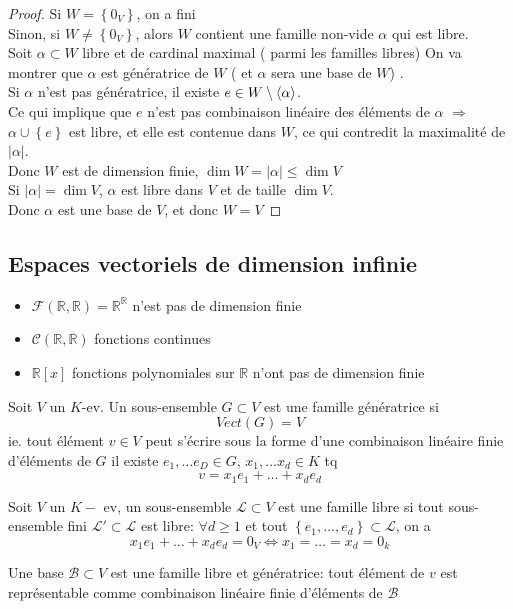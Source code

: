 \documentclass[../main.tex]{subfiles}
\begin{document}
\begin{proof}
	Si $W = \left\{ 0_V \right\} $, on a fini\\
	Sinon, si $W \neq \left\{ 0_V \right\} $, alors $W$ contient une famille non-vide $\alpha$ qui est libre.\\
	Soit $\alpha \subset W$ libre et de cardinal maximal ( parmi les familles libres) 
	On va montrer que $\alpha$ est génératrice de $W$ ( et $\alpha$ sera une base de $W$) .\\
	Si $\alpha$ n'est pas génératrice, il existe $e \in W \setminus \left\langle\alpha\right\rangle$.\\
	Ce qui implique que $e$ n'est pas combinaison linéaire des éléments de $\alpha$ 
	$\Rightarrow$ $\alpha \cup \left\{ e  \right\} $ est libre, et elle est contenue dans $W$, ce qui contredit la maximalité de $|\alpha|$.\\
	Donc $W$ est de dimension finie, $\dim W = |\alpha| \leq \dim V$ \\
	Si $|\alpha| = \dim V$, $\alpha$ est libre dans $V$ et de taille $\dim V$.\\
	Donc $\alpha$ est une base de $V$, et donc $W = V$
\end{proof}
\subsection{Espaces vectoriels de dimension infinie}
\begin{exemple}
\begin{itemize}
	\item $\mathcal{F}( \mathbb{R}, \mathbb{R}) = \mathbb{R}^{\mathbb{R}}$ n'est pas de dimension finie
	\item $\mathcal{C}( \mathbb{R},\mathbb{R}) $ fonctions continues 
	\item $\mathbb{R}[x]$ fonctions polynomiales sur $\mathbb{R}$ n'ont pas de dimension finie
\end{itemize}
\end{exemple}
\begin{defn}
Soit $V$ un $K$-ev. Un sous-ensemble $G \subset V$ est une famille génératrice si
\[ 
	Vect( G) = V
\]
ie. tout élément $v \in V$ peut s'écrire sous la forme d'une combinaison linéaire finie d'éléments de $G$ il existe $e_1, \ldots e_D \in G$, $x_1, \ldots x_d \in K$ tq
\[ 
v = x_1 e_1 + \ldots + x_d e_d
\]

\end{defn}
\begin{defn}
	Soit $V$ un $K-$ ev, un sous-ensemble $\mathcal{L} \subset V$ est une famille libre si tout sous-ensemble fini $\mathcal{L}' \subset \mathcal{L}$ est libre: $\forall d \geq 1$ et tout $ \left\{ e_1, \ldots, e_d \right\} \subset \mathcal{L}$, on a 
	\[ 
	x_1e_1+ \ldots + x_d e_d = 0_V \iff x_1= \ldots = x_d = 0_k
	\]
		
\end{defn}
\begin{defn}
	Une base $\mathcal{B} \subset V$ est une famille libre et génératrice: tout élément de $v$ est représentable comme combinaison linéaire finie d'éléments de $\mathcal{B}$
\end{defn}
\end{document}
